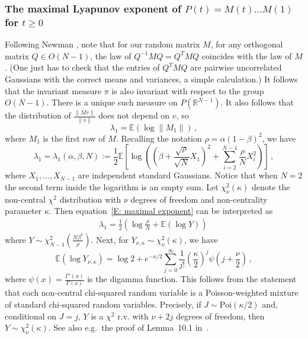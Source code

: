 \documentclass[12pt]{article}
\newcommand{\1}{\mathbf{1}}
\begin{document}
\subsubsection{\texorpdfstring{The maximal Lyapunov exponent of $P(t) = M(t) \dots M(1)$ for $t \ge 0$}{Lg}}\label{SS: max exponent}
Following Newman \cite{Newman}, note that for our random matrix $M$, for any orthogonal matrix $Q \in O(N-1)$, the law of $Q^{-1} M Q = Q^T M Q$ coincides with the law of $M$. (One just has to check that the entries of $Q^T M Q$ are pairwise uncorrelated Gaussians with the correct means and variances, a simple calculation.) It follows that the invariant measure $\pi$ is also invariant with respect to the group $O(N-1)$. There is a unique such measure on $P\left(\mathbb{R}^{N-1}\right)$. It also follows that the distribution of $\frac{\|Mv\|}{\|v\|}$ does not depend on $v$, so 
$$
\lambda_1 = \mathbb{E}\left(\log \|M_1\|\right)\,,    
$$
where $M_1$ is the first row of $M$. Recalling the notation $\rho = \alpha(1-\beta)^2$, we have
\begin{equation}\label{E: maximal exponent}\lambda_1 = \lambda_1(\alpha,\beta,N) := \frac{1}{2}\mathbb{E}\left[\log\left(\left(\beta + \frac{\sqrt{\rho}}{\sqrt{N}}X_1\right)^2 + \sum_{i=2}^{N-1} \frac{\rho}{N} X_i^2 \right) \right]\,,
\end{equation} 
where $X_1, \dots, X_{N-1}$ are independent standard Gaussians. Notice that when $N=2$ the second term inside the logarithm is an empty sum. Let $\chi^2_{\nu}(\kappa)$ denote the non-central $\chi^2$ distribution with $\nu$ degrees of freedom and non-centrality parameter $\kappa$. Then equation~\eqref{E: maximal exponent} can be interpreted  as
\begin{align}\label{eq:lambda1}
\lambda_1 = \frac{1}{2}\left(\log \frac{\rho}{N} + \mathbb{E}(\log Y)\right)\, 
\end{align}
where $Y\sim \chi^2_{N-1}\!\left(\frac{N\beta^2}{\rho}\right)$. Next, for $Y_{\nu,\kappa} \sim \chi^2_\nu(\kappa)$, we have
\begin{equation}\label{E: expectation of log non-central chi-squared}
\mathbb{E}(\log Y_{\nu,\kappa}) = \log 2 +   e^{-\kappa/2} \sum_{j=0}^\infty \frac{1}{j!}
\left(\frac{\kappa}{2}\right)^j
\psi\left(j+\frac{\nu}{2}\right)\,, \end{equation}
where $\psi(x)=\frac{\Gamma'(x)}{\Gamma(x)}$ is the digamma function. This follows from the statement that each non-central chi-squared random variable is a Poisson-weighted mixture of standard chi-squared random variables. Precisely, if $J \sim \mathrm{Poi}(\kappa/2)$ and, conditional on $J=j$, $Y$ is a $\chi^2$ r.v. with $\nu + 2j$ degrees of freedom, then $Y \sim \chi^2_{\nu}(\kappa)$. See also e.g.\ the proof of Lemma~10.1 in~\cite{Capacity}.
\end{document}
